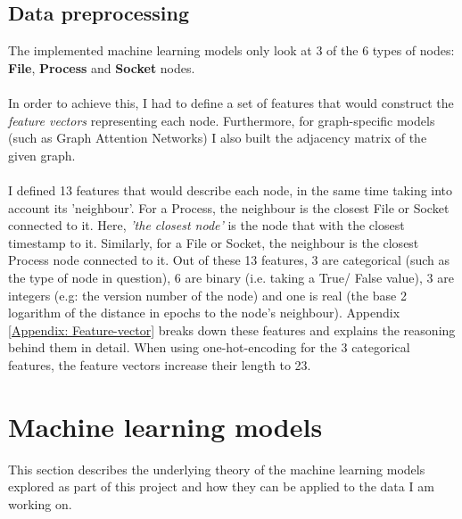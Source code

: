 	\subsection{Data preprocessing} \label{Section: prep/data/feature-vectors}
	The implemented machine learning models only look at 3 of the 6 types of nodes: \textbf{File}, \textbf{Process} and \textbf{Socket} nodes. 
	\\ \\
	In order to achieve this, I had to define a set of features that would construct the \textit{feature vectors} representing each node. Furthermore, for graph-specific models (such as Graph Attention Networks) I also built the adjacency matrix of the given graph. 
	\\ \\
	I defined 13 features that would describe each node, in the same time taking into account its 'neighbour'. For a Process, the neighbour is the closest File or Socket connected to it. Here, \textit{'the closest node'} is the node that with the closest timestamp to it. Similarly, for a File or Socket, the neighbour is the closest Process node connected to it. Out of these 13 features, 3 are categorical (such as the type of node in question), 6 are binary (i.e. taking a True/ False value), 3 are integers (e.g: the version number of the node) and one is real (the base 2 logarithm of the distance in epochs to the node's neighbour). Appendix \ref{Appendix: Feature-vector} breaks down these features and explains the reasoning behind them in detail. When using one-hot-encoding for the 3 categorical features, the feature vectors increase their length to 23.

	\section{Machine learning models} \label{Section 2.2}
	This section describes the underlying theory of the machine learning models explored as part of this project and how they can be applied to the data I am working on.


